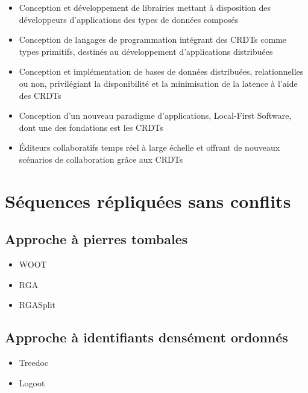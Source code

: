 \documentclass[12pt]{thesul}
\begin{document}
\begin{itemize}
  \item Conception et développement de librairies mettant à disposition des développeurs d'applications des types de données composés \cite{Nicolaescu2015Yjs, Nicolaescu2016YATA, yjsimplem, jsoncrdt2017, automerge}
  \item Conception de langages de programmation intégrant des CRDTs comme types primitifs, destinés au développement d'applications distribuées \cite{Meiklejohn2015Lasp2, DePorre2020cscript}
  \item Conception et implémentation de bases de données distribuées, relationnelles ou non, privilégiant la disponibilité et la minimisation de la latence à l'aide des CRDTs \cite{RiakKV, AntidoteDB, Anna2021, Concordant, yu:hal-02983557}
  \item Conception d'un nouveau paradigme d'applications, Local-First Software, dont une des fondations est les CRDTs \cite{localfirstsoftware2019, pushpin2020}
  \item Éditeurs collaboratifs temps réel à large échelle et offrant de nouveaux scénarios de collaboration grâce aux CRDTs \cite{Nedelec2016CRATE, MUTE2017}
\end{itemize}

\section{Séquences répliquées sans conflits}

\subsection{Approche à pierres tombales}

\begin{itemize}
  \item WOOT \cite{oster:inria-00108523, Weiss_2007, ahmednacer:inria-00629503}
  \item RGA \cite{ROH2011354}
  \item RGASplit \cite{briot:hal-01343941}
\end{itemize}

\subsection{Approche à identifiants densément ordonnés}

\begin{itemize}
  \item Treedoc \cite{5158449}
  \item Logoot \cite{WeissICDCS09, weiss:hal-00450416}
\end{itemize}
\end{document}
